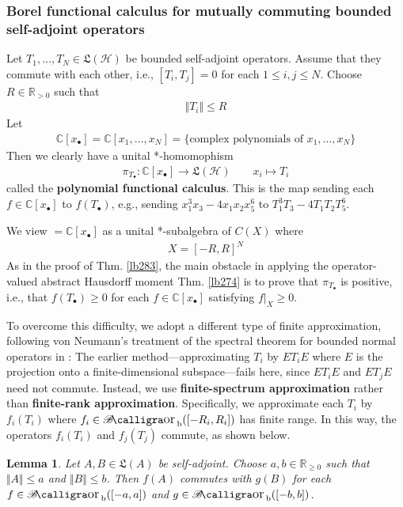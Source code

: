 \documentclass[12pt,b5paper,notitlepage]{article}
\theoremstyle{definition}
\theoremstyle{plain}
\newtheorem{lm}[df]{Lemma}
\DeclareMathOperator{\Borb}{{\mathscr{B}\text{\kern -2pt {\calligra\large or}}\,}_{\mathrm b}}
\newcommand{\fk}{\mathfrak}
\newcommand{\blt}{\bullet}
\newcommand{\Cbb}{\mathbb C}
\newcommand{\Rbb}{\mathbb R}
\newcommand{\MH}{\mathcal H}
\numberwithin{equation}{section}
\begin{document}
\subsubsection{Borel functional calculus for mutually commuting bounded self-adjoint operators}


Let $T_1,\dots,T_N\in\fk L(\MH)$ be bounded self-adjoint operators. Assume that they commute with each other, i.e., $[T_i,T_j]=0$ for each $1\leq i,j\leq N$. Choose $R\in\Rbb_{>0}$ such that
\begin{align*}
\Vert T_i\Vert\leq R
\end{align*}
Let
\begin{align*}
\Cbb[x_\blt]=\Cbb[x_1,\dots,x_N]=\{\text{complex polynomials of }x_1,\dots,x_N\}
\end{align*}
Then we clearly have a unital *-homomophism
\begin{align*}
\pi_{T_\blt}:\Cbb[x_\blt]\rightarrow\fk L(\MH)\qquad x_i\mapsto T_i
\end{align*}
called the \textbf{polynomial functional calculus}.  This is the map sending each $f\in\Cbb[x_\blt]$ to $f(T_\blt)$, e.g., sending $x_1^3x_3-4x_1x_2x_5^6$ to $T_1^3T_3-4T_1T_2T_5^6$.

We view $=\Cbb[x_\blt]$ as a unital *-subalgebra of $C(X)$ where
\begin{align*}
X=[-R,R]^N
\end{align*}
As in the proof of Thm. \ref{lb283}, the main obstacle in applying the operator-valued abstract Hausdorff moment Thm. \ref{lb274} is to prove that $\pi_{T_\blt}$ is positive, i.e., that $f(T_\blt)\geq0$ for each $f\in\Cbb[x_\blt]$ satisfying $f|_X\geq0$. 


To overcome this difficulty, we adopt a different type of finite approximation, following von Neumann’s treatment of the spectral theorem for bounded normal operators in \cite[Anhang 2]{vN29a}: The earlier method---approximating $T_i$ by $ET_iE$ where $E$ is the projection onto a finite-dimensional subspace---fails here, since $ET_iE$ and $ET_jE$ need not commute. Instead, we use \textbf{finite-spectrum approximation} rather than \textbf{finite-rank approximation}. Specifically, we approximate each $T_i$ by $f_i(T_i)$ where $f_i\in\Borb([-R_i,R_i])$ has finite range. In this way, the operators $f_i(T_i)$ and $f_j(T_j)$ commute, as shown below.


\begin{lm}\label{lb295}
Let $A,B\in\fk L(A)$ be self-adjoint. Choose $a,b\in\Rbb_{\geq0}$ such that $\Vert A\Vert\leq a$ and $\Vert B\Vert\leq b$. Then $f(A)$ commutes with $g(B)$ for each $f\in\Borb([-a,a])$ and $g\in\Borb([-b,b])$.
\end{lm}
\end{document}
